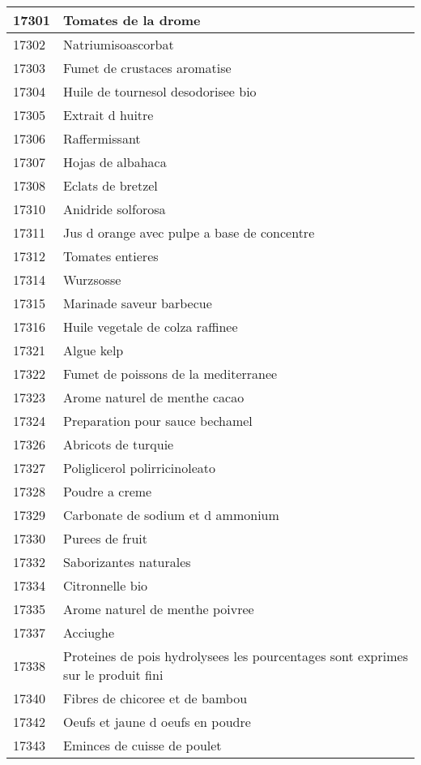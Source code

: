 \begin{longtable}{|l|l|}
17301 & Tomates de la drome \\ \hline 
17302 & Natriumisoascorbat \\ \hline 
17303 & Fumet de crustaces aromatise \\ \hline 
17304 & Huile de tournesol desodorisee bio \\ \hline 
17305 & Extrait d huitre \\ \hline 
17306 & Raffermissant \\ \hline 
17307 & Hojas de albahaca \\ \hline 
17308 & Eclats de bretzel \\ \hline 
17310 & Anidride solforosa \\ \hline 
17311 & Jus d orange avec pulpe a base de concentre \\ \hline 
17312 & Tomates entieres \\ \hline 
17314 & Wurzsosse \\ \hline 
17315 & Marinade saveur barbecue \\ \hline 
17316 & Huile vegetale de colza raffinee \\ \hline 
17321 & Algue kelp \\ \hline 
17322 & Fumet de poissons de la mediterranee \\ \hline 
17323 & Arome naturel de menthe cacao \\ \hline 
17324 & Preparation pour sauce bechamel \\ \hline 
17326 & Abricots de turquie \\ \hline 
17327 & Poliglicerol polirricinoleato \\ \hline 
17328 & Poudre a creme \\ \hline 
17329 & Carbonate de sodium et d ammonium \\ \hline 
17330 & Purees de fruit \\ \hline 
17332 & Saborizantes naturales \\ \hline 
17334 & Citronnelle bio \\ \hline 
17335 & Arome naturel de menthe poivree \\ \hline 
17337 & Acciughe \\ \hline 
17338 & Proteines de pois hydrolysees les pourcentages sont exprimes sur le produit fini \\ \hline 
17340 & Fibres de chicoree et de bambou \\ \hline 
17342 & Oeufs et jaune d oeufs en poudre \\ \hline 
17343 & Eminces de cuisse de poulet \\ \hline 

\end{longtable}

